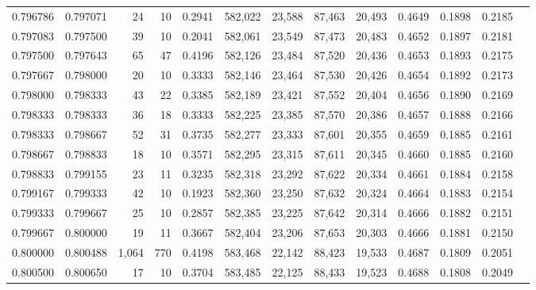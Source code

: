 \begin{tabular}{rrrrrrrrrrrrr}
0.796786 & 0.797071 &    24 &  10 &                                     0.2941 & 582,022 &  23,588 &  87,463 &  20,493 & 0.4649 & 0.1898 & 0.2185 \\
0.797083 & 0.797500 &    39 &  10 &                                     0.2041 & 582,061 &  23,549 &  87,473 &  20,483 & 0.4652 & 0.1897 & 0.2181 \\
0.797500 & 0.797643 &    65 &  47 &                                     0.4196 & 582,126 &  23,484 &  87,520 &  20,436 & 0.4653 & 0.1893 & 0.2175 \\
0.797667 & 0.798000 &    20 &  10 &                                     0.3333 & 582,146 &  23,464 &  87,530 &  20,426 & 0.4654 & 0.1892 & 0.2173 \\
0.798000 & 0.798333 &    43 &  22 &                                     0.3385 & 582,189 &  23,421 &  87,552 &  20,404 & 0.4656 & 0.1890 & 0.2169 \\
0.798333 & 0.798333 &    36 &  18 &                                     0.3333 & 582,225 &  23,385 &  87,570 &  20,386 & 0.4657 & 0.1888 & 0.2166 \\
0.798333 & 0.798667 &    52 &  31 &                                     0.3735 & 582,277 &  23,333 &  87,601 &  20,355 & 0.4659 & 0.1885 & 0.2161 \\
0.798667 & 0.798833 &    18 &  10 &                                     0.3571 & 582,295 &  23,315 &  87,611 &  20,345 & 0.4660 & 0.1885 & 0.2160 \\
0.798833 & 0.799155 &    23 &  11 &                                     0.3235 & 582,318 &  23,292 &  87,622 &  20,334 & 0.4661 & 0.1884 & 0.2158 \\
0.799167 & 0.799333 &    42 &  10 &                                     0.1923 & 582,360 &  23,250 &  87,632 &  20,324 & 0.4664 & 0.1883 & 0.2154 \\
0.799333 & 0.799667 &    25 &  10 &                                     0.2857 & 582,385 &  23,225 &  87,642 &  20,314 & 0.4666 & 0.1882 & 0.2151 \\
0.799667 & 0.800000 &    19 &  11 &                                     0.3667 & 582,404 &  23,206 &  87,653 &  20,303 & 0.4666 & 0.1881 & 0.2150 \\
0.800000 & 0.800488 & 1,064 & 770 &                                     0.4198 & 583,468 &  22,142 &  88,423 &  19,533 & 0.4687 & 0.1809 & 0.2051 \\
0.800500 & 0.800650 &    17 &  10 &                                     0.3704 & 583,485 &  22,125 &  88,433 &  19,523 & 0.4688 & 0.1808 & 0.2049 \\

\end{tabular}

